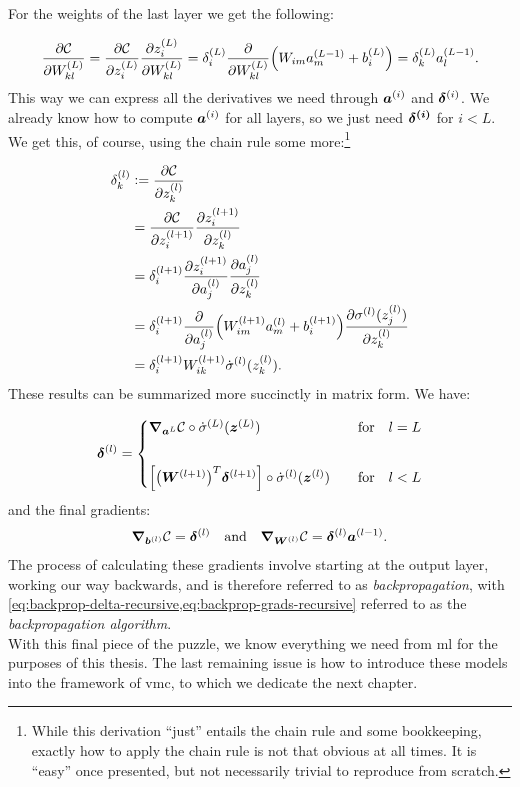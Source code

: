 \documentclass[Thesis.tex]{subfiles}
\begin{document}
For the weights of the last layer we get the following:

\begin{align}
  \pdv{\mathcal{C}}{W_{kl}^{(L)}} =
\pdv{\mathcal{C}}{z_i^{(L)}}\pdv{z_i^{(L)}}{W_{kl}^{(L)}} =
\delta_i^{(L)}\pdv{}{W_{kl}^{(L)}}\qty(W_{im}a_m^{(L-1)} + b_i^{(L)}) = \delta_k^{(L)}a_l^{(L-1)}.
\end{align}
This way we can express all the derivatives we need through $\bm{a}^{(i)}$ and
$\bm{\delta}^{(i)}$. We already know how to compute $\bm{a}^{(i)}$ for all layers,
so we just need $\bm{\delta^{(i)}}$ for $i < L$. We get this, of course, using the
chain rule some more:\footnote{While this derivation ``just'' entails the chain
  rule and some bookkeeping, exactly how to apply the chain rule is not that
  obvious at all times. It is ``easy'' once presented, but not necessarily
  trivial to reproduce from scratch.}

\begin{align}
  \delta_k^{(l)} &\vcentcolon= \pdv{\mathcal{C}}{z_k^{(l)}}\\
                 &= \pdv{\mathcal{C}}{z_i^{(l+1)}}\pdv{z_i^{(l+1)}}{z_k^{(l)}}\\
                 &= \delta_i^{(l+1)} \pdv{z_i^{(l+1)}}{a_j^{(l)}}\pdv{a_j^{(l)}}{z_k^{(l)}} \\
                 &= \delta_i^{(l+1)}\pdv{}{a_j^{(l)}}\qty(W_{im}^{(l+1)}a_m^{(l)} + b_i^{(l+1)})\pdv{\sigma^{(l)}(z_j^{(l)})}{z_k^{(l)}}\\
                 &= \delta_i^{(l+1)}W_{ik}^{(l+1)}\dot\sigma^{(l)}(z_k^{(l)}).
\end{align}
These results can be summarized more succinctly in matrix form. We have:

\begin{align}
  \label{eq:backprop-delta-recursive}
  \vb{\delta}^{(l)} =
                      \begin{cases}
                        \grad_{\vb{a}^{L}}{\mathcal{C}}\circ
                        \dot\sigma^{(L)}(\vb{z}^{(L)}) &\qfor l = L\\[20pt]
                        \qty[\qty(\mat{W}^{(l+1)})^T \vb{\delta}^{(l+1)}]\circ
                            \dot\sigma^{(l)}(\vb{z}^{(l)})&\qfor l < L
                      \end{cases}
\end{align}
and the final gradients:
\begin{align}
  \label{eq:backprop-grads-recursive}
  \grad_{\vb{b}^{(l)}}{\mathcal{C}} = \vb{\delta}^{(l)}
  \qand \grad_{\mat{W}^{(l)}}{\mathcal{C}} = \vb{\delta}^{(l)}\vb{a}^{(l-1)}.
\end{align}
The process of calculating these gradients involve starting at the output layer,
working our way backwards, and is therefore referred to as
\emph{backpropagation}, with
\cref{eq:backprop-delta-recursive,eq:backprop-grads-recursive} referred to as
the \emph{backpropagation algorithm}.\\

With this final piece of the puzzle, we know everything we need from \gls{ml}
for the purposes of this thesis. The last remaining issue is how to introduce
these models into the framework of \gls{vmc}, to which we dedicate the next chapter.
\end{document}
